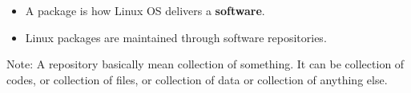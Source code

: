 \setlength{\columnsep}{3pt}
\begin{flushleft}
	\bigskip
	\begin{itemize}
		\item A package is how Linux OS delivers a \textbf{software}.
		\item Linux packages are maintained through software repositories.
	\end{itemize}

	\bigskip
	\begin{tcolorbox}[breakable,notitle,boxrule=-0pt,colback=yellow,colframe=yellow]
		\color{black}
		Note: A repository basically mean collection of something. It can be collection of codes, or collection of files, or collection of data or collection of anything else.
	\end{tcolorbox}
	
\end{flushleft}



